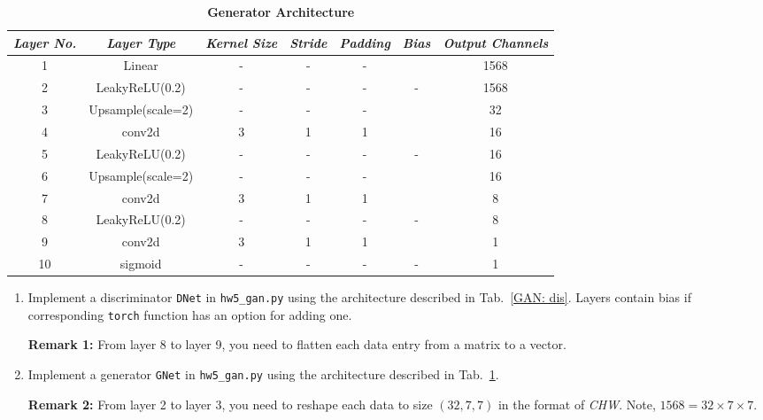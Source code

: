 \begin{Q}
	\begin{table}[h]
		\begin{center}
			\caption{\textbf{Generator Architecture}}
			\label{GAN: gen}
			\begin{tabular}{ccccccc}
				\toprule
				{\small\textit{Layer No.}}
				& {\small \textit{Layer Type}}
				& {\small \textit{Kernel Size}}
				& {\small \textit{Stride}}
				& {\small \textit{Padding}}
				& {\small \textit{Bias}}
				& {\small \textit{Output Channels}} \\
				\midrule
				1 & Linear             & - & - & - & \cmark & 1568 \\
				2 & LeakyReLU(0.2)     & - & - & - & -      & 1568 \\
				3 & Upsample(scale=2)  & - & - & - & \xmark & 32 \\
				4 & conv2d             & 3 & 1 & 1 & \cmark & 16 \\
				5 & LeakyReLU(0.2)     & - & - & - & -      & 16 \\
				6 & Upsample(scale=2)  & - & - & - & \xmark & 16 \\
				7 & conv2d             & 3 & 1 & 1 & \cmark & 8 \\
				8 & LeakyReLU(0.2)     & - & - & - & -      & 8 \\
				9 & conv2d             & 3 & 1 & 1 & \cmark & 1 \\
				10 & sigmoid           & - & - & - & -      & 1 \\
				\bottomrule
			\end{tabular}
		\end{center}
	\end{table}
	
	\begin{enumerate}
		\item Implement a discriminator \texttt{DNet} in \texttt{hw5\_gan.py} using the architecture described in Tab.\ \ref{GAN: dis}. Layers contain bias if corresponding \texttt{torch} function has an option for adding one.
		
		\textbf{Remark 1:} From layer 8 to layer 9, you need to flatten each data entry from a matrix to a vector.
		
		\item Implement a generator \texttt{GNet} in \texttt{hw5\_gan.py} using the architecture described in Tab.\ \ref{GAN: gen}.
		
		\textbf{Remark 2:} From layer 2 to layer 3, you need to reshape each data to size $(32, 7, 7)$ in the format of \textit{CHW}. Note,  $1568 = 32\times7\times7$.
		

\end{enumerate}
\end{Q}
